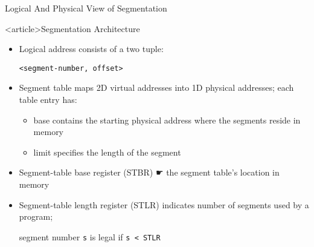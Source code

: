 
\begin{frame}{Logical And Physical View of Segmentation}
  \centering
  \mode<beamer>{ \texttt{[image: mm-seg]} }%
\end{frame}

\begin{frame}<article>{Segmentation Architecture}
  \begin{itemize}
  \item Logical address consists of a \alert{two tuple}:
    \begin{center}
      \texttt{<segment-number, offset>}
    \end{center}
  \item \alert{Segment table} maps 2D virtual addresses into 1D physical
    addresses; each table entry has:
    \begin{itemize}
    \item \alert{base} contains the starting physical address where the segments
      reside in memory
    \item \alert{limit} specifies the length of the segment
    \end{itemize}
  \item \alert{Segment-table base register (STBR)} {☛} the segment table's
    location in memory
  \item \alert{Segment-table length register (STLR)} indicates number of
    segments used by a program;
    \begin{center}
      segment number \texttt{s} is legal if \texttt{s < STLR}
    \end{center}
  \end{itemize}
\end{frame}

